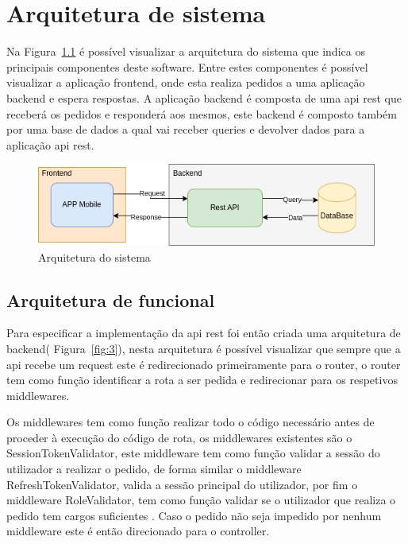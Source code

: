 \chapter{Arquitetura de sistema}
Na Figura~\ref{fig:2} é possível visualizar a arquitetura do sistema que indica os principais 
componentes deste software. Entre estes componentes é possível visualizar a aplicação frontend, 
onde esta realiza pedidos a uma aplicação backend e espera respostas. A aplicação backend é composta 
de uma api rest que receberá os pedidos e responderá aos mesmos, este backend é composto também por 
uma base de dados a qual vai receber queries e devolver dados para a aplicação api rest.

\begin{figure}[htb]
    \centering
    
    \includegraphics[width=\textwidth]{images/Arquiteturas/arquitetura_de_solucao.png}
    \caption{Arquitetura do sistema}
    \label{fig:2}
\end{figure}

\newpage

\section{Arquitetura de funcional}

Para especificar a implementação da api rest foi então criada uma arquitetura de 
backend( Figura~\ref{fig:3}), nesta arquitetura é possível visualizar que sempre que a api 
recebe um request este é redirecionado primeiramente para o router, o router tem como função 
identificar a rota a ser pedida e redirecionar para os respetivos middlewares. 

Os middlewares tem como função realizar todo o código necessário antes de proceder à execução 
do código de rota, os middlewares existentes são o SessionTokenValidator, este middleware tem 
como função validar a sessão do utilizador a realizar o pedido, de forma similar o middleware 
RefreshTokenValidator, valida a sessão principal do utilizador, por fim o middleware RoleValidator, 
tem como função validar se o utilizador que realiza o pedido tem cargos suficientes . 
Caso o pedido não seja impedido por nenhum middleware este é então direcionado para o 
controller.

